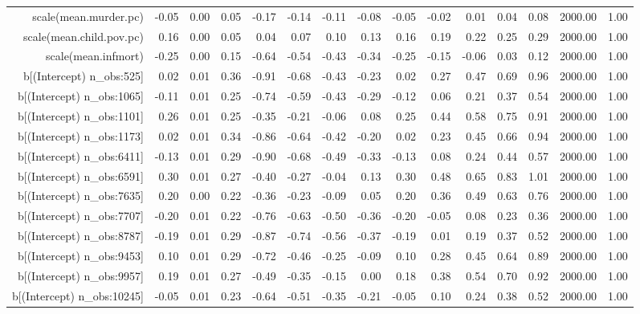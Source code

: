 \begin{table}[ht]
\begin{tabular}{rrrrrrrrrrrrrrr}
  scale(mean.murder.pc) & -0.05 & 0.00 & 0.05 & -0.17 & -0.14 & -0.11 & -0.08 & -0.05 & -0.02 & 0.01 & 0.04 & 0.08 & 2000.00 & 1.00 \\ 
  scale(mean.child.pov.pc) & 0.16 & 0.00 & 0.05 & 0.04 & 0.07 & 0.10 & 0.13 & 0.16 & 0.19 & 0.22 & 0.25 & 0.29 & 2000.00 & 1.00 \\ 
  scale(mean.infmort) & -0.25 & 0.00 & 0.15 & -0.64 & -0.54 & -0.43 & -0.34 & -0.25 & -0.15 & -0.06 & 0.03 & 0.12 & 2000.00 & 1.00 \\ 
  b[(Intercept) n\_obs:525] & 0.02 & 0.01 & 0.36 & -0.91 & -0.68 & -0.43 & -0.23 & 0.02 & 0.27 & 0.47 & 0.69 & 0.96 & 2000.00 & 1.00 \\ 
  b[(Intercept) n\_obs:1065] & -0.11 & 0.01 & 0.25 & -0.74 & -0.59 & -0.43 & -0.29 & -0.12 & 0.06 & 0.21 & 0.37 & 0.54 & 2000.00 & 1.00 \\ 
  b[(Intercept) n\_obs:1101] & 0.26 & 0.01 & 0.25 & -0.35 & -0.21 & -0.06 & 0.08 & 0.25 & 0.44 & 0.58 & 0.75 & 0.91 & 2000.00 & 1.00 \\ 
  b[(Intercept) n\_obs:1173] & 0.02 & 0.01 & 0.34 & -0.86 & -0.64 & -0.42 & -0.20 & 0.02 & 0.23 & 0.45 & 0.66 & 0.94 & 2000.00 & 1.00 \\ 
  b[(Intercept) n\_obs:6411] & -0.13 & 0.01 & 0.29 & -0.90 & -0.68 & -0.49 & -0.33 & -0.13 & 0.08 & 0.24 & 0.44 & 0.57 & 2000.00 & 1.00 \\ 
  b[(Intercept) n\_obs:6591] & 0.30 & 0.01 & 0.27 & -0.40 & -0.27 & -0.04 & 0.13 & 0.30 & 0.48 & 0.65 & 0.83 & 1.01 & 2000.00 & 1.00 \\ 
  b[(Intercept) n\_obs:7635] & 0.20 & 0.00 & 0.22 & -0.36 & -0.23 & -0.09 & 0.05 & 0.20 & 0.36 & 0.49 & 0.63 & 0.76 & 2000.00 & 1.00 \\ 
  b[(Intercept) n\_obs:7707] & -0.20 & 0.01 & 0.22 & -0.76 & -0.63 & -0.50 & -0.36 & -0.20 & -0.05 & 0.08 & 0.23 & 0.36 & 2000.00 & 1.00 \\ 
  b[(Intercept) n\_obs:8787] & -0.19 & 0.01 & 0.29 & -0.87 & -0.74 & -0.56 & -0.37 & -0.19 & 0.01 & 0.19 & 0.37 & 0.52 & 2000.00 & 1.00 \\ 
  b[(Intercept) n\_obs:9453] & 0.10 & 0.01 & 0.29 & -0.72 & -0.46 & -0.25 & -0.09 & 0.10 & 0.28 & 0.45 & 0.64 & 0.89 & 2000.00 & 1.00 \\ 
  b[(Intercept) n\_obs:9957] & 0.19 & 0.01 & 0.27 & -0.49 & -0.35 & -0.15 & 0.00 & 0.18 & 0.38 & 0.54 & 0.70 & 0.92 & 2000.00 & 1.00 \\ 
  b[(Intercept) n\_obs:10245] & -0.05 & 0.01 & 0.23 & -0.64 & -0.51 & -0.35 & -0.21 & -0.05 & 0.10 & 0.24 & 0.38 & 0.52 & 2000.00 & 1.00 \\ 

\end{tabular}
\end{table}
